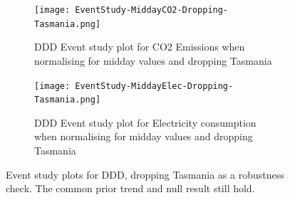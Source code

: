 \begin{figure}[ht]
    \centering
    \begin{subfigure}[t]{0.45\textwidth} 
        \texttt{[image: EventStudy-MiddayCO2-Dropping-Tasmania.png]}
        \caption{\acs{DDD} Event study plot for CO2 Emissions when normalising for midday values and dropping Tasmania}
        \label{fig:ddd event study co2 w/o Tas}
    \end{subfigure}
    \hfill 
    \begin{subfigure}[t]{0.45\textwidth} 
        \texttt{[image: EventStudy-MiddayElec-Dropping-Tasmania.png]}
        \caption{\acs{DDD} Event study plot for Electricity consumption when normalising for midday values and dropping Tasmania} %
        \label{fig:ddd event study Elec w/o Tas}
    \end{subfigure}
    \caption[Event study plots for \acs{DDD} without Tasmania]{Event study plots for \acs{DDD}, dropping Tasmania as a robustness check. The common prior trend and null result still hold.} 
    \label{fig:ddd event study w/o Tas}
\end{figure}


